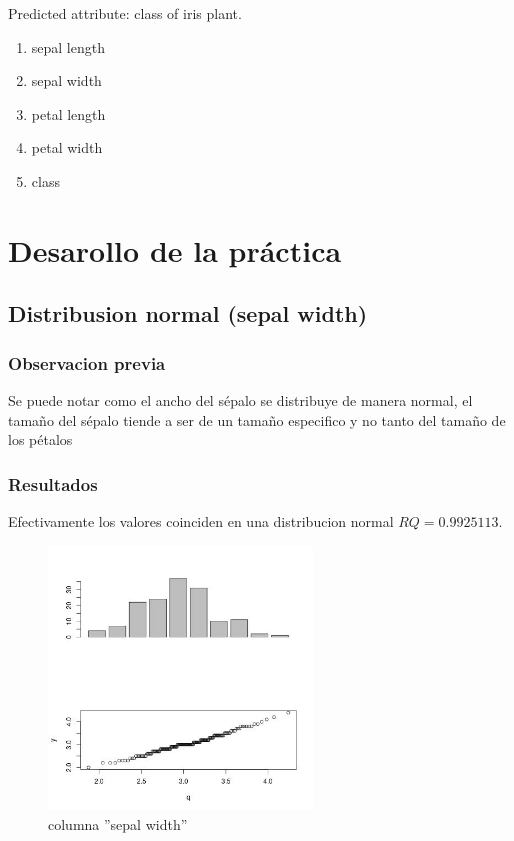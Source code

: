 \documentclass[10pt]{article}
\begin{document}
Predicted attribute: class of iris plant.

\begin{enumerate}
\item sepal length
\item sepal width
\item petal length
\item petal width
\item class
\end{enumerate}

\section*{Desarollo de la práctica}
\label{sec:org6b665f9}
\subsection*{Distribusion normal (sepal width)}
\label{sec:org0e94c68}
\subsubsection*{Observacion previa}
\label{sec:org81621c8}
Se puede notar como el ancho del sépalo se distribuye de manera normal, el tamaño del sépalo tiende a ser de un tamaño especifico y no tanto del tamaño de los pétalos 

\subsubsection*{Resultados}
\label{sec:orgece9e67}
Efectivamente los valores coinciden en una distribucion normal \(RQ = 0.9925113\).

\begin{figure}[htbp]
\centering
\includegraphics[width=7cm]{img/i1.jpeg}
\caption{columna ''sepal width''}
\end{figure}
\end{document}
